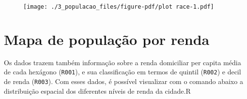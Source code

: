 \documentclass[
  letterpaper,
  DIV=11,
  numbers=noendperiod]{scrreprt}
\begin{document}
\begin{figure}[H]

{\centering \texttt{[image: ./3\_populacao\_files/figure-pdf/plot race-1.pdf]}

}

\end{figure}

\hypertarget{mapa-de-populauxe7uxe3o-por-renda}{%
\section{Mapa de população por
renda}\label{mapa-de-populauxe7uxe3o-por-renda}}

Os dados trazem também informação sobre a renda domiciliar per capita
média de cada hexágono (\texttt{R001}), e sua classificação em termos de
quintil (\texttt{R002}) e decil de renda (\texttt{R003}). Com esses
dados, é possível visualizar com o comando abaixo a distribuição
espacial dos diferentes níveis de renda da cidade.R
\end{document}
